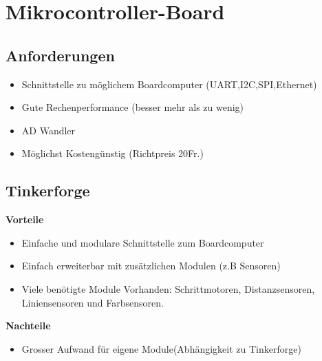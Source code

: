 \section{Mikrocontroller-Board}
\subsection{Anforderungen}
\begin{itemize}
\item Schnittstelle zu möglichem Boardcomputer (UART,I2C,SPI,Ethernet)
\item Gute Rechenperformance (besser mehr als zu wenig)
\item AD Wandler 
\item Möglichst Kostengünstig (Richtpreis 20Fr.)
\end{itemize}


\subsection{Tinkerforge}
\textbf {Vorteile}
\begin{itemize}
\item Einfache und modulare Schnittstelle zum Boardcomputer
\item Einfach erweiterbar mit zusätzlichen Modulen (z.B Sensoren)
\item Viele benötigte Module Vorhanden: Schrittmotoren, Distanzsensoren, Liniensensoren und Farbsensoren.\\
\end{itemize}
\textbf {Nachteile}
\begin{itemize}
\item Grosser Aufwand für eigene Module(Abhängigkeit zu Tinkerforge)
\end{itemize}


